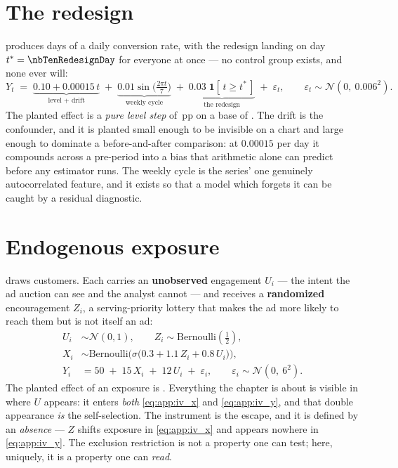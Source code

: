 \section{The redesign}
\label{app:dgp:its}

 produces \nbTenNDays{} days of a daily conversion rate, with the redesign
landing on day $t^{*} = \nbTenRedesignDay$ for everyone at once --- no control group exists, and
none ever will:
%
\begin{equation}
  Y_t \;=\; \underbrace{0.10 + 0.00015\,t}_{\text{level {+} drift}}
        \;+\; \underbrace{0.01 \sin\!\Big(\tfrac{2\pi t}{7}\Big)}_{\text{weekly cycle}}
        \;+\; \underbrace{0.03\;\mathbf 1[\,t \ge t^{*}\,]}_{\text{the redesign}}
        \;+\; \varepsilon_t,
  \qquad \varepsilon_t \sim \mathcal N\!\left(0,\ 0.006^{2}\right).
  \label{eq:app:its_y}
\end{equation}
%
The planted effect is a \emph{pure level step} of \nbTenTrueLift\,pp on a base of
\pc{\nbTenBaseRate}. The drift is the confounder, and it is planted small enough to be invisible on
a chart and large enough to dominate a before-and-after comparison: at $0.00015$ per day it
compounds across a pre-period into a bias that arithmetic alone can predict before any estimator
runs. The weekly cycle is the series' one genuinely autocorrelated feature, and it exists so that a
model which forgets it can be caught by a residual diagnostic.

\section{Endogenous exposure}
\label{app:dgp:iv}

 draws \nbElevenN{} customers. Each carries an \textbf{unobserved} engagement
$U_i$ --- the intent the ad auction can see and the analyst cannot --- and receives a
\textbf{randomized} encouragement $Z_i$, a serving-priority lottery that makes the ad more likely
to reach them but is not itself an ad:
%
\begin{align}
  U_i &\sim \mathcal N(0, 1), \qquad Z_i \sim \text{Bernoulli}(\tfrac12), \label{eq:app:iv_u}\\
  X_i &\sim \text{Bernoulli}\Big(\sigma\big(0.3 + 1.1\,Z_i + 0.8\,U_i\big)\Big), \label{eq:app:iv_x}\\
  Y_i &= 50 \;+\; 15\,X_i \;+\; 12\,U_i \;+\; \varepsilon_i,
        \qquad \varepsilon_i \sim \mathcal N\!\left(0,\ 6^{2}\right). \label{eq:app:iv_y}
\end{align}
%
The planted effect of an exposure is \eur{\nbElevenTrue}. Everything the chapter is about is
visible in where $U$ appears: it enters \emph{both} \cref{eq:app:iv_x} and \cref{eq:app:iv_y}, and
that double appearance \emph{is} the self-selection. The instrument is the escape, and it is
defined by an \emph{absence} --- $Z$ shifts exposure in \cref{eq:app:iv_x} and appears nowhere in
\cref{eq:app:iv_y}. The exclusion restriction is not a property one can test; here, uniquely, it is
a property one can \emph{read}.

